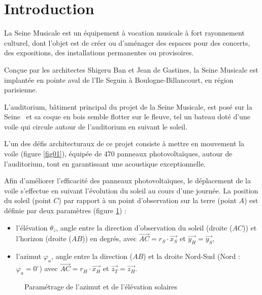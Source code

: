 

\section{Introduction}

La Seine Musicale est un équipement à vocation musicale à fort rayonnement culturel, dont l'objet est de créer ou d'aménager des espaces pour des concerts, des expositions, des installations permanentes ou provisoires.

Conçue par les architectes Shigeru Ban et Jean de Gastines, la Seine Musicale est implantée en pointe aval de l'Ile Seguin à Boulogne-Billancourt, en région parisienne.

L'auditorium, bâtiment principal du projet de la Seine Musicale, est \og posé sur la Seine \fg\ et sa coque en bois semble flotter sur le fleuve, tel un bateau doté d'une voile qui circule autour de l'auditorium en suivant le soleil.

L'un des défis architecturaux de ce projet consiste à mettre en mouvement la voile (figure \ref{fig01}), équipée de 470 panneaux photovoltaïques, autour de l'auditorium, tout en garantissant une acoustique exceptionnelle.


Afin d'améliorer l'efficacité des panneaux photovoltaïques, le déplacement de la voile s'effectue en suivant l'évolution du soleil au cours d'une journée. La position du soleil (point $C$) par rapport à un point d'observation sur la terre (point $A$) est définie par deux paramètres (figure \ref{fig02}) :
\begin{itemize}
 \item l'élévation $\theta_z$, angle entre la direction d'observation du soleil (droite ($AC$)) et l'horizon (droite ($AB$)) en degrés, avec $\overrightarrow{AC}=r_S\cdot\overrightarrow{x_S}$ et $\overrightarrow{y_H}=\overrightarrow{y_S}$,
 \item l'azimut $\varphi_a$, angle entre la direction ($AB$) et la droite Nord-Sud (Nord : $\varphi_a=0^{\circ}$) avec $\overrightarrow{AC}=r_H\cdot\overrightarrow{x_H}$ et $\overrightarrow{z_T}=\overrightarrow{z_H}$.
\end{itemize}

\newpage

\begin{figure}[ht!]
\begin{center}
   \def\svgwidth{.45\textwidth}
   
\end{center}
\caption{\label{fig02} Paramétrage de l'azimut et de l'élévation solaires}
\end{figure}

